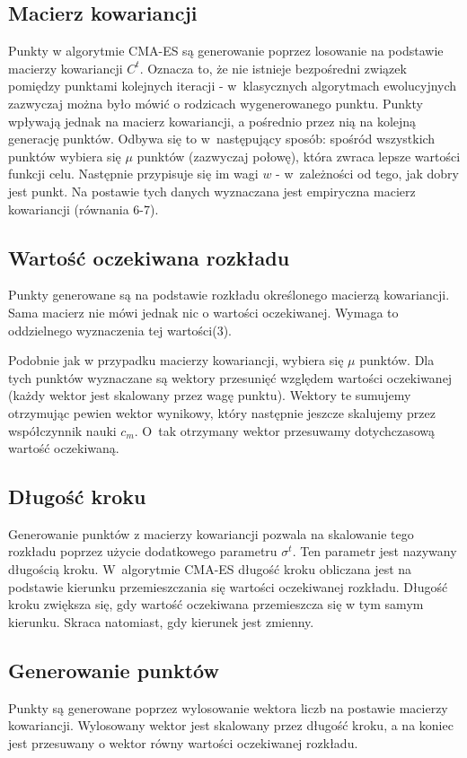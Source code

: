 \documentclass{mini}
\begin{document}
\subsection{Macierz kowariancji} \label{macierz}
Punkty w algorytmie CMA-ES są generowanie poprzez losowanie na podstawie macierzy kowariancji $C^t$. Oznacza to, że nie istnieje bezpośredni związek pomiędzy punktami kolejnych iteracji - w~klasycznych algorytmach ewolucyjnych zazwyczaj można było mówić o rodzicach wygenerowanego punktu. Punkty wpływają jednak na macierz kowariancji, a pośrednio przez nią na kolejną generację punktów. Odbywa się to w~następujący sposób: spośród wszystkich punktów wybiera się $\mu$ punktów (zazwyczaj połowę), która zwraca lepsze wartości funkcji celu. Następnie przypisuje się im wagi $w$ - w~zależności od tego, jak dobry jest punkt. Na postawie tych danych wyznaczana jest empiryczna macierz kowariancji (równania 6-7).

\subsection{Wartość oczekiwana rozkładu} \label{wartoscoczekiwana}
Punkty generowane są na podstawie rozkładu określonego macierzą kowariancji. Sama macierz nie mówi jednak nic o wartości oczekiwanej. Wymaga to oddzielnego wyznaczenia tej wartości(3).

Podobnie jak w przypadku macierzy kowariancji, wybiera się $\mu$ punktów. Dla tych punktów wyznaczane są wektory przesunięć względem wartości oczekiwanej (każdy wektor jest skalowany przez wagę punktu). Wektory te sumujemy otrzymując pewien wektor wynikowy, który następnie jeszcze skalujemy przez współczynnik nauki $c_m$. O~tak otrzymany wektor przesuwamy dotychczasową wartość oczekiwaną.

\subsection{Długość kroku}
Generowanie punktów z macierzy kowariancji pozwala na skalowanie tego rozkładu poprzez użycie dodatkowego parametru $\sigma^t$. Ten parametr jest nazywany długością kroku. W~algorytmie CMA-ES długość kroku obliczana jest na podstawie kierunku przemieszczania się wartości oczekiwanej rozkładu. Długość kroku zwiększa się, gdy wartość oczekiwana przemieszcza się w tym samym kierunku. Skraca natomiast, gdy kierunek jest zmienny.

\subsection{Generowanie punktów}
Punkty są generowane poprzez wylosowanie wektora liczb na postawie macierzy kowariancji. Wylosowany wektor jest skalowany przez długość kroku, a na koniec jest przesuwany o wektor równy wartości oczekiwanej rozkładu.
\end{document}
